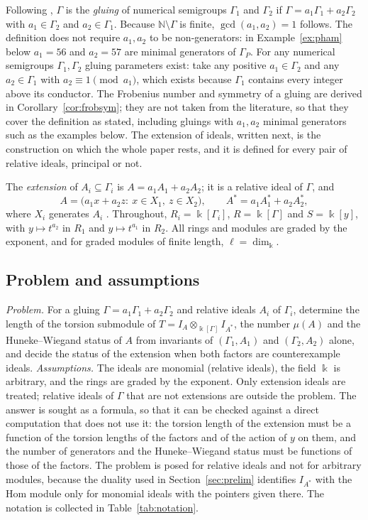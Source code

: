 \documentclass[11pt]{article}
\theoremstyle{definition}
\theoremstyle{remark}
\newcommand{\N}{\mathbb{N}}
\newcommand{\kk}{\Bbbk}
\newcommand{\len}{\ell}
\begin{document}
Following \cite[Section~2]{GarciaSanchezLeamer2013}, $\Gamma$ is the \emph{gluing} of numerical semigroups
$\Gamma_1$ and $\Gamma_2$ if $\Gamma=a_1\Gamma_1+a_2\Gamma_2$ with $a_1\in\Gamma_2$ and $a_2\in\Gamma_1$. Because
$\N\setminus\Gamma$ is finite, $\gcd(a_1,a_2)=1$ follows. The definition does not require $a_1,a_2$ to be non-generators:
in Example~\ref{ex:pham} below $a_1=56$ and $a_2=57$ are minimal generators of $\Gamma_P$. For any numerical
semigroups $\Gamma_1,\Gamma_2$ gluing parameters exist: take any positive $a_1\in\Gamma_2$ and any $a_2\in\Gamma_1$
with $a_2\equiv1\pmod{a_1}$, which exists because $\Gamma_1$ contains every integer above its conductor. The Frobenius number and symmetry of
a gluing are derived in Corollary~\ref{cor:frobsym}; they are not taken from the literature, so that they cover the definition as stated, including gluings with $a_1,a_2$ minimal generators such as the examples below. The extension of ideals, written next, is the construction on which the whole paper rests, and
it is defined for every pair of relative ideals, principal or not.

The \emph{extension} of $A_i\subseteq\Gamma_i$ is $A=a_1A_1+a_2A_2$; it is a relative ideal of $\Gamma$, and
\begin{equation}\label{eq:extension}
A=\bigl(a_1x+a_2z:\ x\in X_1,\ z\in X_2\bigr),\qquad A^*=a_1A_1^*+a_2A_2^*,
\end{equation}
where $X_i$ generates $A_i$ \cite[Lemma~8(1) and Lemma~8(9)]{GarciaSanchezLeamer2013}. Throughout, $R_i=\kk[\Gamma_i]$,
$R=\kk[\Gamma]$ and $S=\kk[y]$, with $y\mapsto t^{a_2}$ in $R_1$ and $y\mapsto t^{a_1}$ in $R_2$. All rings and
modules are graded by the exponent, and for graded modules of finite length, $\len=\dim_\kk$.

\subsection{Problem and assumptions}

\emph{Problem.} For a gluing $\Gamma=a_1\Gamma_1+a_2\Gamma_2$ and relative ideals $A_i$ of $\Gamma_i$, determine the
length of the torsion submodule of $T=I_A\otimes_{\kk[\Gamma]}I_{A^*}$, the number $\mu(A)$ and the
Huneke--Wiegand status of $A$ from invariants of $(\Gamma_1,A_1)$ and $(\Gamma_2,A_2)$ alone, and decide the status
of the extension when both factors are counterexample ideals. \emph{Assumptions.} The ideals are monomial (relative
ideals), the field $\kk$ is arbitrary, and the rings are graded by the exponent. Only extension ideals are treated;
relative ideals of $\Gamma$ that are not extensions are outside the problem. The answer is sought as a formula, so that it can be checked against a direct computation that does not use it:
the torsion length of the extension must be a function of the torsion lengths of the factors and of the action of $y$ on them, and the
number of generators and the Huneke--Wiegand status must be functions of those of the factors. The problem is posed for relative
ideals and not for arbitrary modules, because the duality used in Section~\ref{sec:prelim} identifies $I_{A^*}$ with the Hom module only for monomial ideals
with the pointers given there. The notation is collected in
Table~\ref{tab:notation}.
\end{document}
